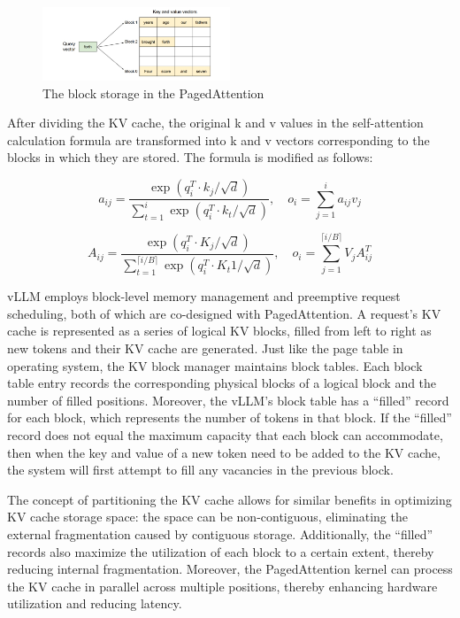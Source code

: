 \documentclass[conference]{IEEEtran}
\begin{document}
\begin{figure}[htbp]
    \centerline{\includegraphics[width=0.5\textwidth]{process figM1.png}}
    \caption{The block storage in the PagedAttention \cite{b1}}
    \label{fig}
\end{figure}

After dividing the KV cache, the original k and v values in the self-attention calculation formula are transformed into k and v vectors corresponding to the blocks in which they are stored. The formula is modified as follows:

\[a_{ij} = \frac{\exp(q_i^{T} \cdot k_j / \sqrt{d})}{\sum_{t=1}^{i} \exp(q_i^{T} \cdot k_t / \sqrt{d})}, \quad o_i = \sum_{j=1}^{i} a_{ij} v_j\]

\[A_{ij} = \frac{\exp(q_i^{T} \cdot K_j / \sqrt{d})}{\sum_{t=1}^{\lceil {i/B} \rceil} \exp(q_i^{T} \cdot K_t1 / \sqrt{d})}, \quad o_i = \sum_{j=1}^{\lceil {i/B} \rceil} V_j A_{ij}^{T}\]

vLLM employs block-level memory management and preemptive request scheduling, both of which are co-designed with PagedAttention. A request’s KV cache is represented as a series of logical KV blocks, filled from left to right as new tokens and their KV cache are generated. Just like the page table in operating system, the KV block manager maintains block tables. Each block table entry records the corresponding physical blocks of a logical block and the number of filled positions. Moreover, the vLLM’s block table has a “filled” record for each block, which represents the number of tokens in that block. If the “filled” record does not equal the maximum capacity that each block can accommodate, then when the key and value of a new token need to be added to the KV cache, the system will first attempt to fill any vacancies in the previous block.

The concept of partitioning the KV cache allows for similar benefits in optimizing KV cache storage space: the space can be non-contiguous, eliminating the external fragmentation caused by contiguous storage. Additionally, the “filled” records also maximize the utilization of each block to a certain extent, thereby reducing internal fragmentation. Moreover, the PagedAttention kernel can process the KV cache in parallel across multiple positions, thereby enhancing hardware utilization and reducing latency.
\end{document}
